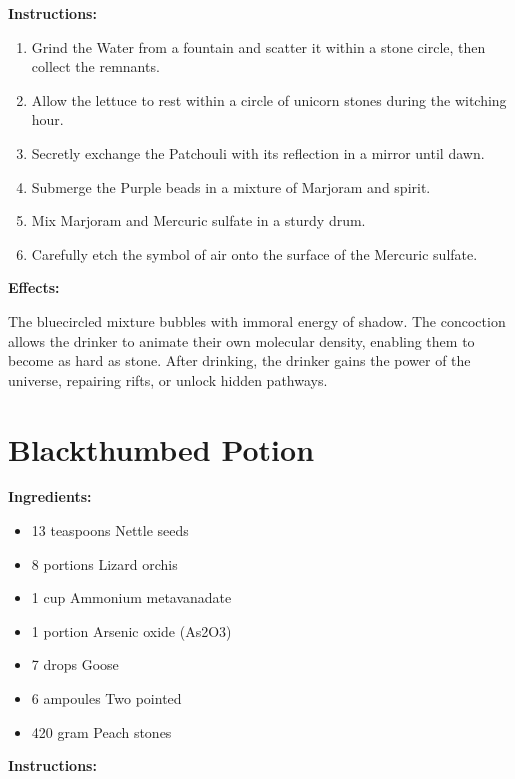 \documentclass{article}
\begin{document}
\textbf{Instructions:}

\begin{enumerate}
  \item Grind the Water from a fountain and scatter it within a stone circle, then collect the remnants.
  \item Allow the lettuce to rest within a circle of unicorn stones during the witching hour.
  \item Secretly exchange the Patchouli with its reflection in a mirror until dawn.
  \item Submerge the Purple beads in a mixture of Marjoram and spirit.
  \item Mix Marjoram and Mercuric sulfate in a sturdy drum.
  \item Carefully etch the symbol of air onto the surface of the Mercuric sulfate.
\end{enumerate}

\textbf{Effects:}

The bluecircled mixture bubbles with immoral energy of shadow. The concoction allows the drinker to animate their own molecular density, enabling them to become as hard as stone. After drinking, the drinker gains the power of the universe, repairing rifts, or unlock hidden pathways.

\newpage
\section*{Blackthumbed Potion}

\textbf{Ingredients:}

\begin{itemize}
  \item 13 teaspoons Nettle seeds
  \item 8 portions Lizard orchis
  \item 1 cup Ammonium metavanadate
  \item 1 portion Arsenic oxide (As2O3)
  \item 7 drops Goose
  \item 6 ampoules Two pointed
  \item 420 gram Peach stones
\end{itemize}

\textbf{Instructions:}
\end{document}
